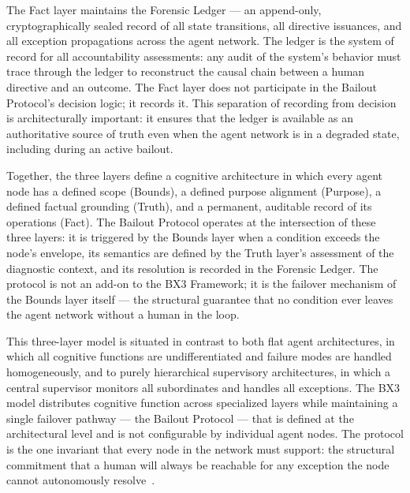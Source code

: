 The Fact layer maintains the Forensic Ledger — an append-only, cryptographically sealed record of all state transitions, all directive issuances, and all exception propagations across the agent network. The ledger is the system of record for all accountability assessments: any audit of the system's behavior must trace through the ledger to reconstruct the causal chain between a human directive and an outcome. The Fact layer does not participate in the Bailout Protocol's decision logic; it records it. This separation of recording from decision is architecturally important: it ensures that the ledger is available as an authoritative source of truth even when the agent network is in a degraded state, including during an active bailout.

Together, the three layers define a cognitive architecture in which every agent node has a defined scope (Bounds), a defined purpose alignment (Purpose), a defined factual grounding (Truth), and a permanent, auditable record of its operations (Fact). The Bailout Protocol operates at the intersection of these three layers: it is triggered by the Bounds layer when a condition exceeds the node's envelope, its semantics are defined by the Truth layer's assessment of the diagnostic context, and its resolution is recorded in the Forensic Ledger. The protocol is not an add-on to the BX3 Framework; it is the failover mechanism of the Bounds layer itself — the structural guarantee that no condition ever leaves the agent network without a human in the loop.

This three-layer model is situated in contrast to both flat agent architectures, in which all cognitive functions are undifferentiated and failure modes are handled homogeneously, and to purely hierarchical supervisory architectures, in which a central supervisor monitors all subordinates and handles all exceptions. The BX3 model distributes cognitive function across specialized layers while maintaining a single failover pathway — the Bailout Protocol — that is defined at the architectural level and is not configurable by individual agent nodes. The protocol is the one invariant that every node in the network must support: the structural commitment that a human will always be reachable for any exception the node cannot autonomously resolve~\cite{wiener1948,tristr81}.